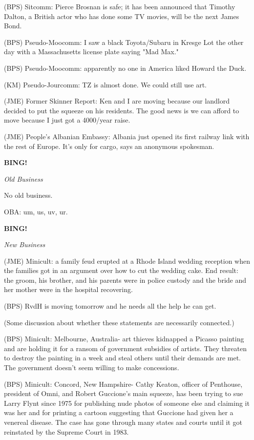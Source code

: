 \documentclass[12pt]{article}
\newcommand{\bing}{{\bf BING!} }
\newcommand{\goto}[1]{\bing \vskip 12pt \centerline{{\em{#1}}}}
\begin{document}
(BPS) Sitcomm: Pierce Brosnan is safe; it has been announced that Timothy Dalton, a British actor who has done some TV movies, will be the next James Bond.

(BPS) Pseudo-Moocomm: I saw a black Toyota/Subaru in Kresge Lot the other day with a Massachusetts license plate saying "Mad Max."

(BPS) Pseudo-Moocomm: apparently no one in America liked Howard the Duck.

(KM) Pseudo-Jourcomm: TZ is almost done. We could still use art.

(JME) Former Skinner Report: Ken and I are moving because our landlord decided to put the squeeze on his residents. The good news is we can afford to move because I just got a 4000/year raise.

(JME) People's Albanian Embassy: Albania just opened its first railway link with the rest of Europe. It's only for cargo, says an anonymous spokesman.

\goto{Old Business}

No old business.

OBA: um, us, uv, ur.

\goto{New Business}

(JME) Minicult: a family feud erupted at a Rhode Island wedding reception when the families got in an argument over how to cut the wedding cake. End result: the groom, his brother, and his parents were in police custody and the bride and her mother were in the hospital recovering.

(BPS) RvdH is moving tomorrow and he needs all the help he can get.

(Some discussion about whether these statements are necessarily connected.)

(BPS) Minicult: Melbourne, Australia- art thieves kidnapped a Picasso painting and are holding it for a ransom of government subsidies of artists. They threaten to destroy the painting in a week and steal others until their demands are met. The government doesn't seem willing to make concessions.

(BPS) Minicult: Concord, New Hampshire- Cathy Keaton, officer of Penthouse, president of Omni, and Robert Guccione's main squeeze, has been trying to sue Larry Flynt since 1975 for publishing nude photos of someone else and claiming it was her and for printing a cartoon suggesting that Guccione had given her a venereal disease. The case has gone through many states and courts until it got reinstated by the Supreme Court in 1983.
\end{document}
